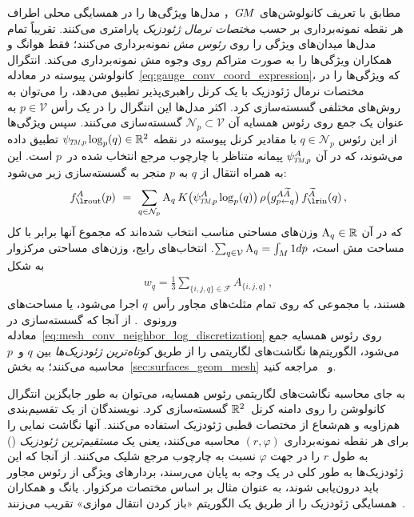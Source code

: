 مطابق با تعریف کانولوشن‌های $G\mkern-1.4muM$， مدل‌ها ویژگی‌ها را در همسایگی محلی اطراف هر نقطه نمونه‌برداری بر حسب \emph{مختصات نرمال ژئودزیک} پارامتری می‌کنند.
تقریباً تمام مدل‌ها میدان‌های ویژگی را روی \emph{رئوس مش} نمونه‌برداری می‌کنند؛ فقط هوانگ و همکاران\cite{huang2019texturenet} ویژگی‌ها را به صورت متراکم روی وجوه مش نمونه‌برداری می‌کند.
انتگرال کانولوشن پیوسته در معادله~\eqref{eq:gauge_conv_coord_expression}، که ویژگی‌ها را در مختصات نرمال ژئودزیک با یک کرنل راهبری‌پذیر تطبیق می‌دهد، را می‌توان به روش‌های مختلفی گسسته‌سازی کرد.
اکثر مدل‌ها این انتگرال را در یک رأس $p\in\mathcal{V}$ به عنوان یک جمع روی رئوس همسایه آن $\mathcal{N}_p \subset \mathcal{V}$ گسسته‌سازی می‌کنند.
سپس ویژگی‌ها از این رئوس $q\in\mathcal{N}_p$ با مقادیر کرنل پیوسته در نقطه $\psiTMp \log_p(q) \in \R^2$ تطبیق داده می‌شوند، که در آن $\psiTMp^A$ پیمانه متناظر با چارچوب مرجع انتخاب شده در~$p$ است.
این به همراه انتقال از $q$ به $p$ منجر به گسسته‌سازی زیر می‌شود:
\begin{align}\label{eq:mesh_conv_neighbor_log_discretization}
    \fout^A(p)\ =\ \sum_{q\in\mathcal{N}_p} \textup{A}_q\, K\big(\psiTMp^A \log_p(q)\big)\, \rho\big( g^{A\widetilde{A}}_{p\leftarrow q} \big)\, \fin^{\widetilde{A}}(q) \,,
\end{align}
که در آن $\textup{A}_q \in \mathbb{R}$ وزن‌های مساحتی مناسب انتخاب شده‌اند که مجموع آنها برابر با کل مساحت مش است، ${\sum_{q\in\mathcal{V}} \textup{A}_q = \int_M 1 dp}$.
انتخاب‌های رایج، وزن‌های مساحتی مرکزوار به شکل
\begin{align}\label{eq:triangle_area_weights}
    w_q = \frac{1}{3} \sum_{\{i,j,q\}\in\mathcal{F}} A_{\{i,j,q\}} \,,
\end{align}
هستند، با مجموعی که روی تمام مثلث‌های مجاور رأس~$q$ اجرا می‌شود، یا مساحت‌های ورونوی~\cite{vouga2014lectures}.
از آنجا که گسسته‌سازی در معادله~\eqref{eq:mesh_conv_neighbor_log_discretization} روی رئوس همسایه جمع می‌شود، الگوریتم‌ها نگاشت‌های لگاریتمی را از طریق \emph{کوتاه‌ترین ژئودزیک‌ها} بین $q$ و~$p$ محاسبه می‌کنند؛ به بخش~\ref{sec:surfaces_geom_mesh} و~\cite{polthier1998straightest} مراجعه کنید.

به جای محاسبه نگاشت‌های لگاریتمی رئوس همسایه، می‌توان به طور جایگزین انتگرال کانولوشن را روی دامنه کرنل~$\mathbb{R}^2$ گسسته‌سازی کرد.
نویسندگان \cite{masci2015geodesic} از یک تقسیم‌بندی هم‌زاویه و هم‌شعاع از مختصات قطبی ژئودزیک استفاده می‌کنند.
آنها نگاشت نمایی را برای هر نقطه نمونه‌برداری $(r,\varphi)$ محاسبه می‌کنند، یعنی یک \emph{مستقیم‌ترین ژئودزیک} (\cite{polthier1998straightest}) به طول $r$ را در جهت $\varphi$ نسبت به چارچوب مرجع شلیک می‌کنند.
از آنجا که این ژئودزیک‌ها به طور کلی در یک وجه به پایان می‌رسند، بردارهای ویژگی از رئوس مجاور باید درون‌یابی شوند،
به عنوان مثال بر اساس مختصات مرکزوار.
یانگ و همکاران\cite{Yang2020parallelFrameCNN} همسایگی ژئودزیک را از طریق یک الگوریتم «باز کردن انتقال موازی» تقریب می‌زنند~\cite{budninskiy2018parallel}.


